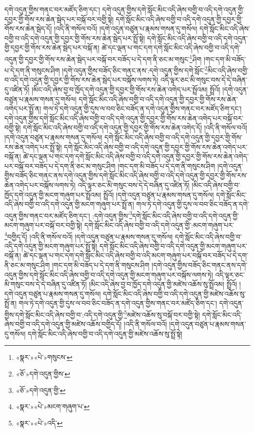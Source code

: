 དགེ་འདུན་གྱིས་གནང་བར་མཛོད་ཅིག་དང་། དགེ་འདུན་གྱིས་དགེ་སློང་མིང་འདི་ཞེས་བགྱི་བ་འདི་དགེ་འདུན་གྱི་དབྱར་གྱི་གོས་རས་ཆེན་སྦེད་པར་བསྐོ་བར་བགྱི་སྟེ། དགེ་སློང་མིང་འདི་ཞེས་བགྱི་བ་འདི་དགེ་འདུན་གྱི་དབྱར་གྱི་གོས་རས་ཆེན་སྦེད་དོ། །འདི་ནི་གསོལ་བའོ། །དགེ་འདུན་བཙུན་པ་རྣམས་གསན་དུ་གསོལ། དགེ་སློང་མིང་འདི་ཞེས་བགྱི་བ་འདི་དགེ་འདུན་གྱི་དབྱར་གྱི་གོས་རས་ཆེན་སྦེད་པར་སྤྲོ་སྟེ། དགེ་སློང་མིང་འདི་ཞེས་བགྱི་བ་འདི་དགེ་འདུན་གྱི་དབྱར་གྱི་གོས་རས་ཆེན་སྦེད་པར་བསྐོ་ན། ཚེ་དང་ལྡན་པ་གང་དག་དགེ་སློང་མིང་འདི་ཞེས་བགྱི་བ་འདི་དགེ་འདུན་གྱི་དབྱར་གྱི་གོས་རས་ཆེན་སྦེད་པར་བསྐོ་བར་བཟོད་པ་དེ་དག་ནི་ཅང་མ་གསུང་\footnote{«སྣར་»«པེ་»གསུངས་}ཤིག །གང་དག་མི་བཟོད་པ་དེ་དག་ནི་གསུངས་ཤིག །དགེ་འདུན་གྱིས་བཟོད་ཅིང་གནང་ནས་:དགེ་འདུན་གྱིས་དགེ་སློང་\footnote{«ཅོ་»དགེ་འདུན་གྱིས་}མིང་འདི་ཞེས་བགྱི་བ་འདི་དགེ་འདུན་གྱི་དབྱར་གྱི་གོས་རས་ཆེན་སྦེད་པར་བསྐོས་ལགས་ཏེ། འདི་ལྟར་ཅང་མི་གསུང་བས་དེ་དེ་བཞིན་དུ་འཛིན་ཏོ། །མིང་འདི་ཞེས་བྱ་བ་ཁྱོད་དགེ་འདུན་གྱི་དབྱར་གྱི་གོས་རས་ཆེན་འགེད་པར་སྤྲོའམ། སྤྲོའོ། །དགེ་འདུན་བཙུན་པ་རྣམས་གསན་དུ་གསོལ། དགེ་སློང་མིང་འདི་ཞེས་བགྱི་བ་འདི་དགེ་འདུན་གྱི་དབྱར་གྱི་གོས་རས་ཆེན་འགེད་པར་སྤྲོ་ན། གལ་ཏེ་དགེ་འདུན་གྱི་དུས་ལ་བབ་ཅིང་བཟོད་ན་དགེ་འདུན་གྱིས་གནང་བར་མཛོད་ཅིག་དང་། དགེ་འདུན་གྱིས་དགེ་སློང་མིང་འདི་ཞེས་བགྱི་བ་འདི་དགེ་འདུན་གྱི་དབྱར་གྱི་གོས་རས་ཆེན་འགེད་པར་བསྐོ་བར་བགྱི་སྟེ། དགེ་སློང་མིང་འདི་ཞེས་བགྱི་བ་འདི་དགེ་འདུན་གྱི་དབྱར་གྱི་གོས་རས་ཆེན་འགེད་དོ། །འདི་ནི་གསོལ་བའོ། །དགེ་འདུན་བཙུན་པ་རྣམས་གསན་དུ་གསོལ། དགེ་སློང་མིང་འདི་ཞེས་བགྱི་བ་འདི་དགེ་འདུན་གྱི་དབྱར་གྱི་གོས་རས་ཆེན་འགེད་པར་སྤྲོ་སྟེ། དགེ་སློང་མིང་འདི་ཞེས་བགྱི་བ་འདི་དགེ་འདུན་གྱི་དབྱར་གྱི་གོས་རས་ཆེན་འགེད་པར་བསྐོ་ན། ཚེ་དང་ལྡན་པ་གང་དག་དགེ་སློང་མིང་འདི་ཞེས་བགྱི་བ་འདི་དགེ་འདུན་གྱི་དབྱར་གྱི་གོས་རས་ཆེན་འགེད་པར་བསྐོ་བར་བཟོད་པ་དེ་དག་ནི་ཅང་མ་གསུང་ཤིག །གང་དག་མི་བཟོད་པ་དེ་དག་ནི་གསུངས་ཤིག །དགེ་འདུན་གྱིས་བཟོད་ཅིང་གནང་ནས་དགེ་འདུན་གྱིས་དགེ་སློང་མིང་འདི་ཞེས་བགྱི་བ་འདི་དགེ་འདུན་གྱི་དབྱར་གྱི་གོས་རས་ཆེན་འགེད་པར་བསྐོས་ལགས་ཏེ། འདི་ལྟར་ཅང་མི་གསུང་བས་དེ་དེ་བཞིན་དུ་འཛིན་ཏོ། །མིང་འདི་ཞེས་བགྱི་བ་ཁྱོད་དགེ་འདུན་གྱི་མངག་གཞུག་པར་སྤྲོའམ། སྤྲོའོ། །དགེ་འདུན་བཙུན་པ་རྣམས་གསན་དུ་གསོལ། དགེ་སློང་མིང་འདི་ཞེས་བགྱི་བ་འདི་དགེ་འདུན་གྱི་མངག་གཞུག་པར་སྤྲོ་ན། གལ་ཏེ་དགེ་འདུན་གྱི་དུས་ལ་བབ་ཅིང་བཟོད་ན་དགེ་འདུན་གྱིས་གནང་བར་མཛོད་ཅིག་དང་། :དགེ་འདུན་གྱིས་\footnote{«ཅོ་»དགེ་འདུན་གྱི་}དགེ་སློང་མིང་འདི་ཞེས་བགྱི་བ་འདི་དགེ་འདུན་གྱི་མངག་གཞུག་པར་བསྐོ་བར་བགྱི་སྟེ། དགེ་སློང་མིང་འདི་ཞེས་བགྱི་བ་འདི་དགེ་འདུན་གྱི་:མངག་གཞུག་པར་\footnote{«སྣར་»«པེ་»མངག་གཞུག་པ་}བགྱིད་དོ། །འདི་ནི་གསོལ་བའོ། །དགེ་འདུན་བཙུན་པ་རྣམས་གསན་དུ་གསོལ། དགེ་སློང་མིང་འདི་ཞེས་བགྱི་བ་འདི་དགེ་འདུན་གྱི་མངག་གཞུག་པར་སྤྲོ་སྟེ། དགེ་སློང་མིང་འདི་ཞེས་བགྱི་བ་འདི་དགེ་འདུན་གྱི་མངག་གཞུག་པར་བསྐོ་ན། ཚེ་དང་ལྡན་པ་གང་དག་དགེ་སློང་མིང་འདི་ཞེས་བགྱི་བ་འདི་མངག་གཞུག་པར་བསྐོ་བར་བཟོད་པ་དེ་དག་ནི་ཅང་མ་གསུང་ཤིག །གང་དག་མི་བཟོད་པ་དེ་དག་ནི་གསུངས་ཤིག །དགེ་འདུན་གྱིས་བཟོད་ཅིང་གནང་ནས་དགེ་འདུན་གྱིས་དགེ་སློང་མིང་འདི་ཞེས་བགྱི་བ་འདི་དགེ་འདུན་གྱི་མངག་གཞུག་པར་བསྐོས་ལགས་ཏེ། འདི་ལྟར་ཅང་མི་གསུང་བས་དེ་དེ་བཞིན་དུ་འཛིན་ཏོ། །མིང་འདི་ཞེས་བྱ་བ་ཁྱོད་དགེ་འདུན་གྱི་མཛེས་འཆོས་སུ་སྤྲོའམ། སྤྲོའོ། །དགེ་འདུན་བཙུན་པ་རྣམས་གསན་དུ་གསོལ། དགེ་སློང་མིང་འདི་ཞེས་བགྱི་བ་འདི་དགེ་འདུན་གྱི་མཛེས་འཆོས་སུ་སྤྲོ་ན། གལ་ཏེ་དགེ་འདུན་གྱི་དུས་ལ་བབ་ཅིང་བཟོད་ན་དགེ་འདུན་གྱིས་གནང་བར་མཛོད་ཅིག་དང་། དགེ་འདུན་གྱིས་དགེ་སློང་མིང་འདི་ཞེས་བགྱི་བ་:འདི་དགེ་འདུན་གྱི་\footnote{«སྣར་»«པེ་»འདི་}མཛེས་འཆོས་སུ་བསྐོ་བར་བགྱི་སྟེ། དགེ་སློང་མིང་འདི་ཞེས་བགྱི་བ་འདི་དགེ་འདུན་གྱི་མཛེས་འཆོས་བགྱིད་དོ། །འདི་ནི་གསོལ་བའོ། །དགེ་འདུན་བཙུན་པ་རྣམས་གསན་དུ་གསོལ། དགེ་སློང་མིང་འདི་ཞེས་བགྱི་བ་འདི་དགེ་འདུན་གྱི་མཛེས་འཆོས་སུ་སྤྲོ་སྟེ། 